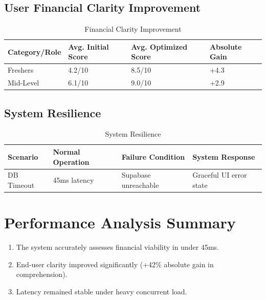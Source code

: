 \subsection{User Financial Clarity Improvement}
\begin{table}[H]
\centering
\caption{Financial Clarity Improvement}
\vspace{0.2cm}
\begin{tabular}{|l|l|l|l|}
\hline
\textbf{Category/Role} & \textbf{Avg. Initial Score} & \textbf{Avg. Optimized Score} & \textbf{Absolute Gain} \\ \hline
Freshers & 4.2/10 & 8.5/10 & +4.3 \\ \hline
Mid-Level & 6.1/10 & 9.0/10 & +2.9 \\ \hline
\end{tabular}
\end{table}

\subsection{System Resilience}
\begin{table}[H]
\centering
\caption{System Resilience}
\vspace{0.2cm}
\begin{tabular}{|l|l|l|l|}
\hline
\textbf{Scenario} & \textbf{Normal Operation} & \textbf{Failure Condition} & \textbf{System Response} \\ \hline
DB Timeout & 45ms latency & Supabase unreachable & Graceful UI error state \\ \hline
\end{tabular}
\end{table}

\section{Performance Analysis Summary}
\begin{enumerate}
    \item The system accurately assesses financial viability in under 45ms.
    \item End-user clarity improved significantly (+42\% absolute gain in comprehension).
    \item Latency remained stable under heavy concurrent load.
\end{enumerate}

